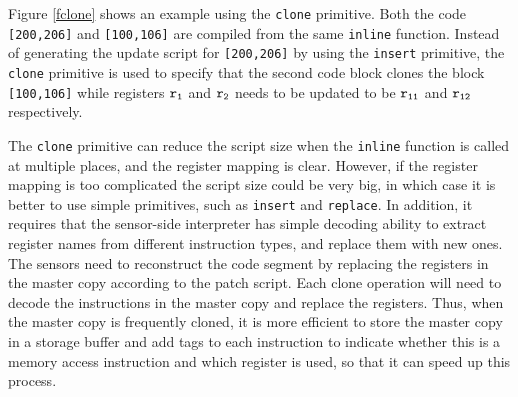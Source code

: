 Figure \ref{fclone} shows an example using the {\tt clone} primitive.  Both the code {\tt [200,206]} and {\tt [100,106]} are compiled from the same {\tt inline} function. Instead of generating the update script for {\tt [200,206]} by using the {\tt insert} primitive, the {\tt clone} primitive is used to specify that the second code block clones the block {\tt [100,106]} while registers  
${\tt r_1}$ and ${\tt r_2}$ needs to be updated to be ${\tt r_{11}}$ and ${\tt r_{12}}$ respectively.

The {\tt clone} primitive can reduce the script size when the {\tt inline} function is
called at multiple places, and the register mapping is clear. However, if the register mapping
is too complicated the script size could be very big, in which case it is better to use simple primitives, such as {\tt insert} and {\tt replace}. In addition, it requires that the sensor-side interpreter has simple decoding ability to extract register names from different instruction types, and replace them with new ones. 
The sensors need to reconstruct the code segment
by replacing the registers in the master copy according to the patch script.
Each clone operation will need to decode the instructions in the master copy and
replace the registers. Thus, when the master copy is frequently cloned, it is more
efficient to store the master copy in a storage buffer and add tags
to each instruction to indicate whether this is a memory access instruction and
which register is used, so that it can speed up this process.




